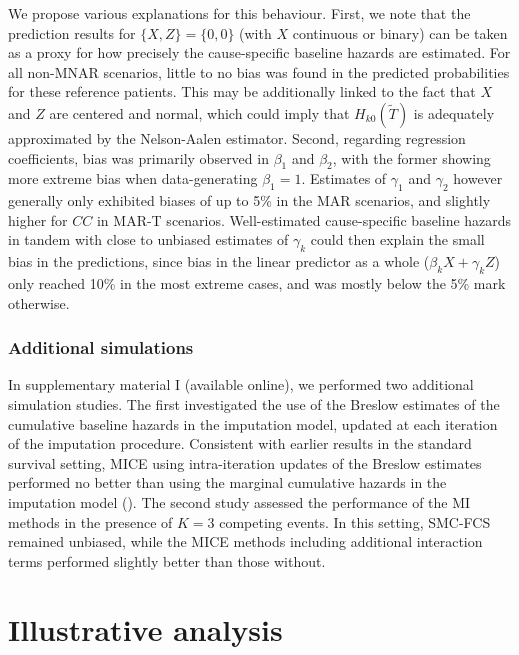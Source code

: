 \documentclass[
  letterpaper,
  paper=240mm:170mm,
  twoside=true,
  open=right,
  fontsize=10pt,
  pagesize=false,
  BCOR=15mm,
  DIV=14,
  headinclude=true,
  footinclude=false,
  headsepline=on]{scrbook}
\begin{document}
We propose various explanations for this behaviour. First, we note that
the prediction results for \(\{X,Z\} = \{0, 0\}\) (with \(X\) continuous
or binary) can be taken as a proxy for how precisely the cause-specific
baseline hazards are estimated. For all non-MNAR scenarios, little to no
bias was found in the predicted probabilities for these reference
patients. This may be additionally linked to the fact that \(X\) and
\(Z\) are centered and normal, which could imply that
\(H_{k0}(\tilde{T})\) is adequately approximated by the Nelson-Aalen
estimator. Second, regarding regression coefficients, bias was primarily
observed in \(\beta_1\) and \(\beta_2\), with the former showing more
extreme bias when data-generating \(\beta_1 = 1\). Estimates of
\(\gamma_1\) and \(\gamma_2\) however generally only exhibited biases of
up to 5\% in the MAR scenarios, and slightly higher for \(CC\) in MAR-T
scenarios. Well-estimated cause-specific baseline hazards in tandem with
close to unbiased estimates of \(\gamma_k\) could then explain the small
bias in the predictions, since bias in the linear predictor as a whole
(\(\beta_k X + \gamma_k Z\)) only reached 10\% in the most extreme
cases, and was mostly below the 5\% mark otherwise.

\subsubsection{Additional simulations}\label{additional-simulations}

In supplementary material I (available online), we performed two
additional simulation studies. The first investigated the use of the
Breslow estimates of the cumulative baseline hazards in the imputation
model, updated at each iteration of the imputation procedure. Consistent
with earlier results in the standard survival setting, MICE using
intra-iteration updates of the Breslow estimates performed no better
than using the marginal cumulative hazards in the imputation model
(). The second study assessed the performance of the MI methods in
the presence of \(K = 3\) competing events. In this setting, SMC-FCS
remained unbiased, while the MICE methods including additional
interaction terms performed slightly better than those without.

\section{Illustrative analysis}\label{sec-illust-analysis}
\end{document}
